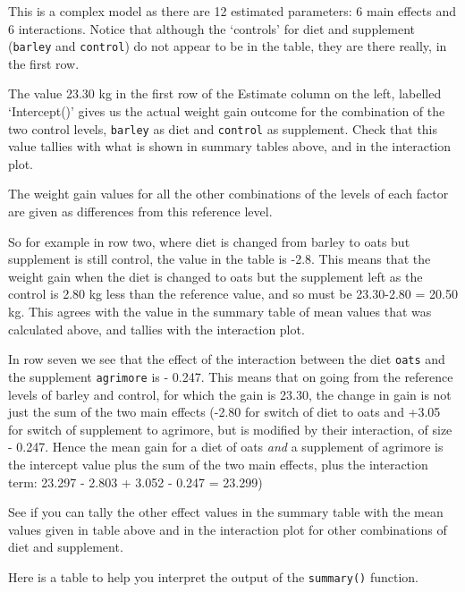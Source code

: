 \documentclass[
  letterpaper,
  DIV=11,
  numbers=noendperiod]{scrreprt}
\begin{document}
This is a complex model as there are 12 estimated parameters: 6 main
effects and 6 interactions. Notice that although the `controls' for diet
and supplement (\texttt{barley} and \texttt{control}) do not appear to
be in the table, they are there really, in the first row.

The value 23.30 kg in the first row of the Estimate column on the left,
labelled `Intercept()' gives us the actual weight gain outcome for the
combination of the two control levels, \texttt{barley} as diet and
\texttt{control} as supplement. Check that this value tallies with what
is shown in summary tables above, and in the interaction plot.

The weight gain values for all the other combinations of the levels of
each factor are given as differences from this reference level.

So for example in row two, where diet is changed from barley to oats but
supplement is still control, the value in the table is -2.8. This means
that the weight gain when the diet is changed to oats but the supplement
left as the control is 2.80 kg less than the reference value, and so
must be 23.30-2.80 = 20.50 kg. This agrees with the value in the summary
table of mean values that was calculated above, and tallies with the
interaction plot.

In row seven we see that the effect of the interaction between the diet
\texttt{oats} and the supplement \texttt{agrimore} is - 0.247. This
means that on going from the reference levels of barley and control, for
which the gain is 23.30, the change in gain is not just the sum of the
two main effects (-2.80 for switch of diet to oats and +3.05 for switch
of supplement to agrimore, but is modified by their interaction, of size
- 0.247. Hence the mean gain for a diet of oats \emph{and} a supplement
of agrimore is the intercept value plus the sum of the two main effects,
plus the interaction term: 23.297 - 2.803 + 3.052 - 0.247 = 23.299)

See if you can tally the other effect values in the summary table with
the mean values given in table above and in the interaction plot for
other combinations of diet and supplement.

Here is a table to help you interpret the output of the
\texttt{summary()} function.
\end{document}
